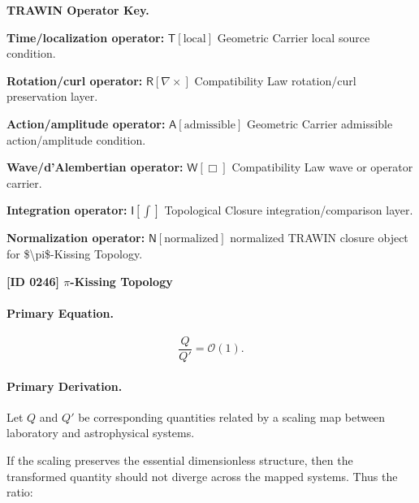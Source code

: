 \par\vspace{0.45\baselineskip}
\noindent\begin{minipage}[t]{\linewidth}
\begingroup
\small
\raggedright
\textbf{TRAWIN Operator Key.}\par
\noindent\textbf{Time/localization operator:} $\mathsf{T}\!\left[\mathrm{local}\right]$ Geometric Carrier local source condition.\par
\noindent\textbf{Rotation/curl operator:} $\mathsf{R}\!\left[\nabla\times\right]$ Compatibility Law rotation/curl preservation layer.\par
\noindent\textbf{Action/amplitude operator:} $\mathsf{A}\!\left[\mathrm{admissible}\right]$ Geometric Carrier admissible action/amplitude condition.\par
\noindent\textbf{Wave/d'Alembertian operator:} $\mathsf{W}\!\left[\Box\right]$ Compatibility Law wave or operator carrier.\par
\noindent\textbf{Integration operator:} $\mathsf{I}\!\left[\int\right]$ Topological Closure integration/comparison layer.\par
\noindent\textbf{Normalization operator:} $\mathsf{N}\!\left[\mathrm{normalized}\right]$ normalized TRAWIN closure object for \$\textbackslash{}pi\$-Kissing Topology.\par
\endgroup
\end{minipage}

\clearpage
\noindent\textbf{[ID 0246] $\pi$-Kissing Topology}\par
\vspace{0.35em}
\paragraph{Primary Equation.}
\begin{equation}
\frac{Q}{Q'}
=
\mathcal{O}(1).
\end{equation}

\paragraph{Primary Derivation.}
Let $Q$ and $Q'$ be corresponding quantities related by a scaling map between laboratory and astrophysical systems.

If the scaling preserves the essential dimensionless structure, then the transformed quantity should not diverge across the mapped systems. Thus the ratio:

